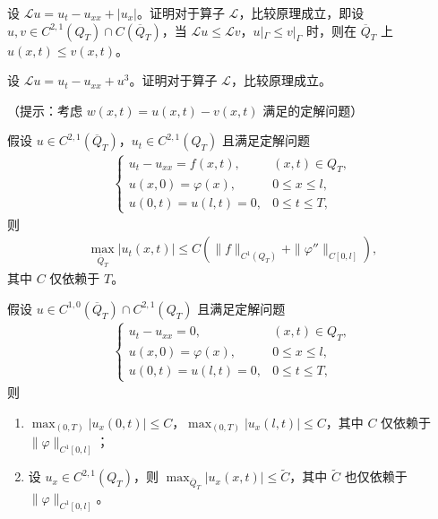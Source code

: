\documentclass[../../main.tex]{subfiles}%
\begin{document}
\begin{example}
设 $\mathcal{L}u=u_t-u_{xx}+|u_x|$。证明对于算子 $\mathcal{L}$，比较原理成立，即设 $u,v\in C^{2,1}(Q_T)\cap C(\overline{Q}_T)$，当 $\mathcal{L}u\leqslant \mathcal{L}v$，$u|_\Gamma\leqslant v|_\Gamma$ 时，则在 $\overline{Q}_T$ 上 $u(x,t)\leqslant v(x,t)$。
\end{example}

\begin{example}
设 $\mathcal{L}u=u_t-u_{xx}+u^3$。证明对于算子 $\mathcal{L}$，比较原理成立。

（提示：考虑 $w(x,t)=u(x,t)-v(x,t)$ 满足的定解问题）
\end{example}

\begin{example}
假设 $u\in C^{2,1}(\overline{Q}_T)$，$u_t\in C^{2,1}(Q_T)$ 且满足定解问题
\begin{align*}
\begin{cases}
u_t-u_{xx}=f(x,t), & (x,t)\in Q_T,\\
u(x,0)=\varphi(x), & 0\leqslant x\leqslant l,\\
u(0,t)=u(l,t)=0, & 0\leqslant t\leqslant T,
\end{cases}
\end{align*}
则
\begin{align*}
\max_{\overline{Q}_T}|u_t(x,t)|\leqslant C(\|f\|_{C^1(Q_T)}+\|\varphi''\|_{C[0,l]}),
\end{align*}
其中 $C$ 仅依赖于 $T$。
\end{example}

\begin{example}
假设 $u\in C^{1,0}(\overline{Q}_T)\cap C^{2,1}(Q_T)$ 且满足定解问题
\begin{align*}
\begin{cases}
u_t-u_{xx}=0, & (x,t)\in Q_T,\\
u(x,0)=\varphi(x), & 0\leqslant x\leqslant l,\\
u(0,t)=u(l,t)=0, & 0\leqslant t\leqslant T,
\end{cases}
\end{align*}
则
\begin{enumerate}[(1)]
\item $\max_{(0,T)}|u_x(0,t)|\leqslant C$，$\max_{(0,T)}|u_x(l,t)|\leqslant C$，其中 $C$ 仅依赖于 $\|\varphi\|_{C^1[0,l]}$；
\item 设 $u_x\in C^{2,1}(Q_T)$，则 $\max_{\overline{Q}_T}|u_x(x,t)|\leqslant \tilde{C}$，其中 $\tilde{C}$ 也仅依赖于 $\|\varphi\|_{C^1[0,l]}$。
\end{enumerate}
\end{example}
\end{document}
